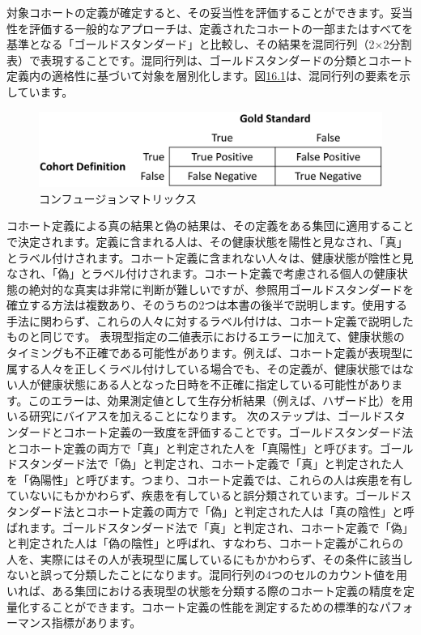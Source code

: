 \documentclass[
  11pt]{book}
\theoremstyle{definition}
\theoremstyle{definition}
\theoremstyle{definition}
\theoremstyle{definition}
\theoremstyle{remark}
\begin{document}
対象コホートの定義が確定すると、その妥当性を評価することができます。妥当性を評価する一般的なアプローチは、定義されたコホートの一部またはすべてを基準となる「ゴールドスタンダード」と比較し、その結果を混同行列（2×2分割表）で表現することです。混同行列は、ゴールドスタンダードの分類とコホート定義内の適格性に基づいて対象を層別化します。図\href{https://ohdsi.github.io/TheBookOfOhdsi/ClinicalValidity.html\#fig:matrix}{16.1}は、混同行列の要素を示しています。

\begin{figure}

{\centering \includegraphics[width=0.75\linewidth]{images/ClinicalValidity/matrix} 

}

\caption{コンフュージョンマトリックス}\label{fig:matrix}
\end{figure}

コホート定義による真の結果と偽の結果は、その定義をある集団に適用することで決定されます。定義に含まれる人は、その健康状態を陽性と見なされ、「真」とラベル付けされます。コホート定義に含まれない人々は、健康状態が陰性と見なされ、「偽」とラベル付けされます。コホート定義で考慮される個人の健康状態の絶対的な真実は非常に判断が難しいですが、参照用ゴールドスタンダードを確立する方法は複数あり、そのうちの2つは本書の後半で説明します。使用する手法に関わらず、これらの人々に対するラベル付けは、コホート定義で説明したものと同じです。 表現型指定の二値表示におけるエラーに加えて、健康状態のタイミングも不正確である可能性があります。例えば、コホート定義が表現型に属する人々を正しくラベル付けしている場合でも、その定義が、健康状態ではない人が健康状態にある人となった日時を不正確に指定している可能性があります。このエラーは、効果測定値として生存分析結果（例えば、ハザード比）を用いる研究にバイアスを加えることになります。 次のステップは、ゴールドスタンダードとコホート定義の一致度を評価することです。ゴールドスタンダード法とコホート定義の両方で「真」と判定された人を「真陽性」と呼びます。ゴールドスタンダード法で「偽」と判定され、コホート定義で「真」と判定された人を「偽陽性」と呼びます。つまり、コホート定義では、これらの人は疾患を有していないにもかかわらず、疾患を有していると誤分類されています。ゴールドスタンダード法とコホート定義の両方で「偽」と判定された人は「真の陰性」と呼ばれます。ゴールドスタンダード法で「真」と判定され、コホート定義で「偽」と判定された人は「偽の陰性」と呼ばれ、すなわち、コホート定義がこれらの人を、実際にはその人が表現型に属しているにもかかわらず、その条件に該当しないと誤って分類したことになります。混同行列の4つのセルのカウント値を用いれば、ある集団における表現型の状態を分類する際のコホート定義の精度を定量化することができます。コホート定義の性能を測定するための標準的なパフォーマンス指標があります。
\end{document}
